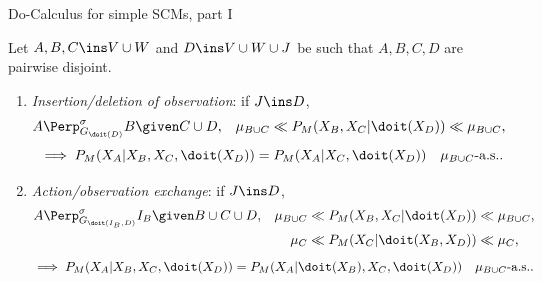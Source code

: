 
\begin{frame}{Do-Calculus for simple SCMs, part I}
  \begin{Thm}[\ref{thm:as-do-calculus-scms-simplified}]
  Let $A,B,C \ins V \cup W$ and $D \ins V \cup W \cup J$ be such that $A,B,C,D$ are pairwise disjoint.
  \small
  \begin{enumerate}
      \item \emph{Insertion/deletion of observation}: if $J \ins D$, 
       \begin{align*} 
           A &\Perp^\sigma_{G_{\doit(D)}} B \given C \cup D, &
           \mu_{B \cup C} &\ll P_M(X_B,X_C|\doit(X_{D}))\ll \mu_{B \cup C},
       \end{align*}
          \[ \implies P_M(X_A|X_B,X_C,\doit(X_{D})) = P_M(X_A|X_C,\doit(X_{D})) \quad \mu_{B \cup C}\text{-a.s.}.\]
     \item \emph{Action/observation exchange}: if $J \ins D$,
       \begin{align*} 
           A & \Perp^\sigma_{G_{\doit(I_B,D)}} I_B \given B \cup C \cup D, &          
                  \mu_{B \cup C} &\ll  P_M(X_B,X_C|\doit(X_{D})) \ll \mu_{B \cup C},\\
               &&   \mu_C &\ll  P_M(X_C|\doit(X_B,X_{D})) \ll \mu_C,
       \end{align*}
       \[ \implies P_M(X_A|X_B,X_C,\doit(X_{D}))  = P_M(X_A|\doit(X_B),X_C,\doit(X_{D})) \quad \mu_{B \cup C}\text{-a.s.}.\]
    \end{enumerate}
\end{Thm}
\end{frame}

